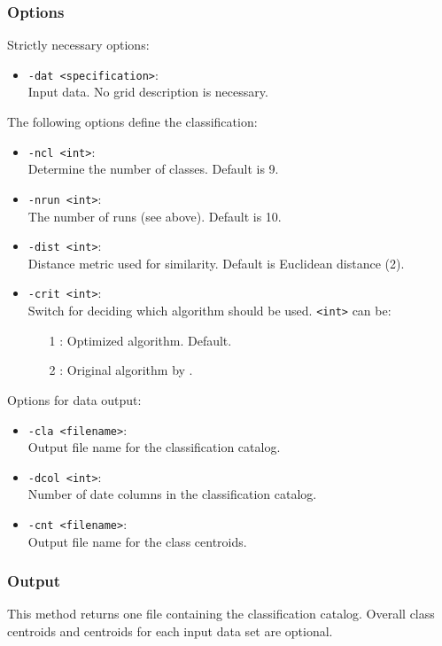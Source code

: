 \documentclass[12pt, oneside, a4paper, headsepline, plainheadsepline]{scrbook}
\begin{document}
\subsubsection*{Options}
Strictly necessary options:
\begin{itemize}
 \item \verb+-dat <specification>+:\\ Input data. No grid description is necessary.
\end{itemize}
The following options define the classification:
\begin{itemize}
 \item \verb+-ncl <int>+:\\ Determine the number of classes. Default is 9.
 \item \verb+-nrun <int>+:\\ The number of runs (see above). Default is 10.
 \item \verb+-dist <int>+:\\ Distance metric used for similarity. Default is Euclidean distance (2).
 \item \verb+-crit <int>+:\\ Switch for deciding which algorithm should be used. \verb+<int>+ can be:
 \begin{itemize}
  \item[1]: Optimized algorithm. Default.
  \item[2]: Original algorithm by \citet{Hartigan1979}.
 \end{itemize}
\end{itemize}
Options for data output:
\begin{itemize}
 \item \verb+-cla <filename>+:\\ Output file name for the classification catalog.
 \item \verb+-dcol <int>+:\\ Number of date columns in the classification catalog.
 \item \verb+-cnt <filename>+:\\ Output file name for the class centroids.
\end{itemize}

\subsubsection*{Output}
This method returns one file containing the classification catalog. 
Overall class centroids and centroids for each input data set are optional.
\end{document}
